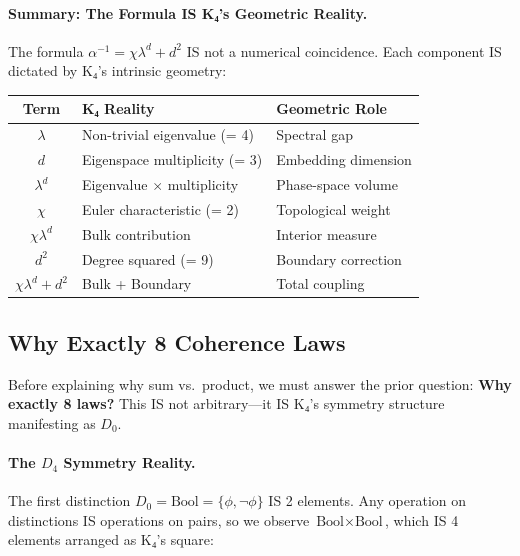 \documentclass[11pt,a4paper]{book}
\begin{document}
\paragraph{Summary: The Formula IS K₄'s Geometric Reality.}

The formula $\alpha^{-1} = \chi \lambda^d + d^2$ IS not a numerical coincidence. 
Each component IS dictated by K₄'s intrinsic geometry:

\begin{center}
\begin{tabular}{cll}
\hline
\textbf{Term} & \textbf{K₄ Reality} & \textbf{Geometric Role} \\
\hline
$\lambda$ & Non-trivial eigenvalue (= 4) & Spectral gap \\
$d$ & Eigenspace multiplicity (= 3) & Embedding dimension \\
$\lambda^d$ & Eigenvalue $\times$ multiplicity & Phase-space volume \\
$\chi$ & Euler characteristic (= 2) & Topological weight \\
$\chi \lambda^d$ & Bulk contribution & Interior measure \\
$d^2$ & Degree squared (= 9) & Boundary correction \\
$\chi \lambda^d + d^2$ & Bulk + Boundary & Total coupling \\
\hline
\end{tabular}
\end{center}

\subsection{Why Exactly 8 Coherence Laws}
\label{sec:why-8-laws}

Before explaining why sum vs.\ product, we must answer the prior question:
\textbf{Why exactly 8 laws?} This IS not arbitrary—it IS K₄'s 
symmetry structure manifesting as $D_0$.

\paragraph{The $D_4$ Symmetry Reality.}

The first distinction $D_0 = \text{Bool} = \{\phi, \neg\phi\}$ IS 2 elements.
Any operation on distinctions IS operations on pairs, so we observe 
$\text{Bool} \times \text{Bool}$, which IS 4 elements arranged as K₄'s square:

\begin{center}
\end{center}
\end{document}
